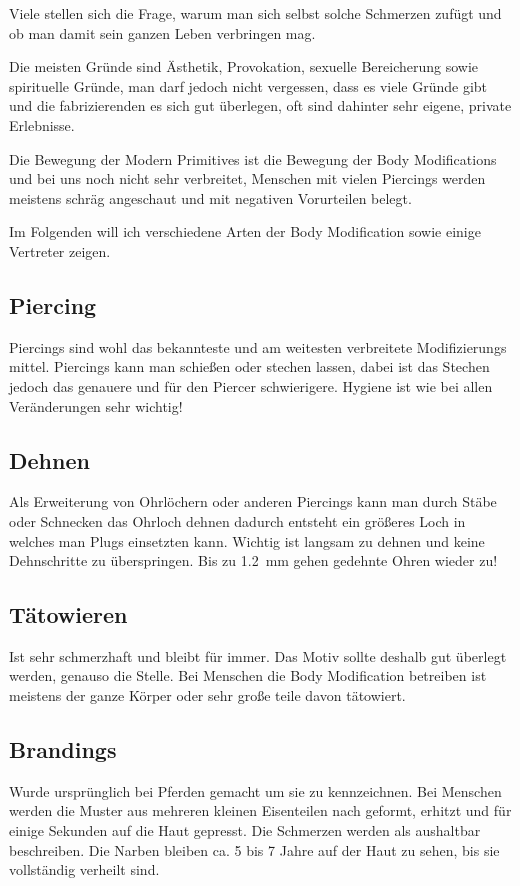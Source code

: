 Viele stellen sich die Frage, warum man sich selbst solche Schmerzen zufügt und ob man damit sein
ganzen Leben verbringen mag.

Die meisten Gründe sind Ästhetik, Provokation, sexuelle Bereicherung sowie spirituelle Gründe, man
darf jedoch nicht vergessen, dass es viele Gründe gibt und die fabrizierenden es sich gut überlegen,
oft sind dahinter sehr eigene, private Erlebnisse.

Die Bewegung der Modern Primitives ist die Bewegung der Body Modifications und bei uns noch nicht
sehr verbreitet, Menschen mit vielen Piercings werden meistens schräg angeschaut und mit negativen
Vorurteilen belegt.

Im Folgenden will ich verschiedene Arten der Body Modification sowie einige Vertreter zeigen.

\subsection{Piercing}
Piercings sind wohl das bekannteste und am weitesten verbreitete Modifizierungs mittel. Piercings
kann man schießen oder stechen lassen, dabei ist das Stechen jedoch das genauere und für den Piercer
schwierigere. Hygiene ist wie bei allen Veränderungen sehr wichtig!

\subsection{Dehnen}
Als Erweiterung von Ohrlöchern oder anderen Piercings kann man durch Stäbe oder Schnecken das Ohrloch
dehnen dadurch entsteht ein größeres Loch in welches man Plugs einsetzten kann. Wichtig ist langsam
zu dehnen und keine Dehnschritte zu überspringen. Bis zu \SI{1,2}{\milli\metre} gehen gedehnte Ohren
wieder zu!

\subsection{Tätowieren}
Ist sehr schmerzhaft und bleibt für immer. Das Motiv sollte deshalb gut überlegt werden, genauso die
Stelle. Bei Menschen die Body Modification betreiben ist meistens der ganze Körper oder sehr große
teile davon tätowiert.

\subsection{Brandings}
Wurde ursprünglich bei Pferden gemacht um sie zu kennzeichnen. Bei Menschen werden die Muster aus
mehreren kleinen Eisenteilen nach geformt, erhitzt und für einige Sekunden auf die Haut gepresst. Die
Schmerzen werden als aushaltbar beschreiben. Die Narben bleiben ca. 5 bis 7 Jahre auf der Haut zu
sehen, bis sie vollständig verheilt sind.

